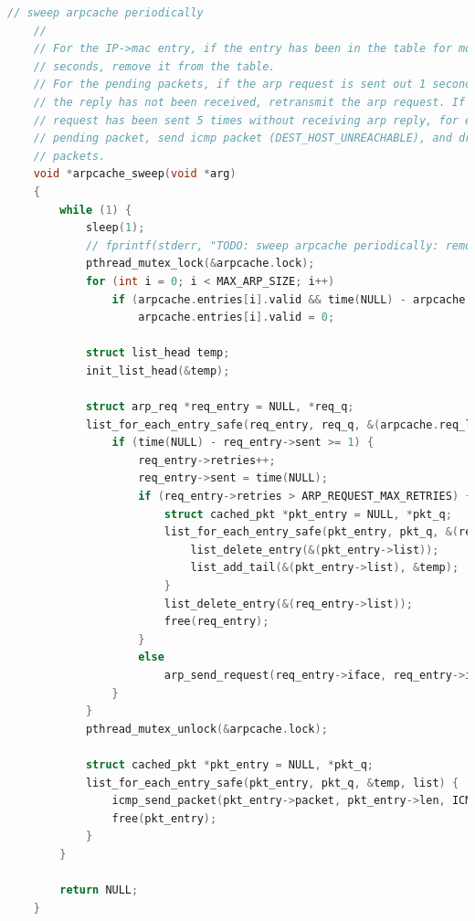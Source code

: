 \documentclass[UTF8]{report}
\begin{document}
\begin{lstlisting}[language=C]
    // sweep arpcache periodically
    //
    // For the IP->mac entry, if the entry has been in the table for more than 15
    // seconds, remove it from the table.
    // For the pending packets, if the arp request is sent out 1 second ago, while 
    // the reply has not been received, retransmit the arp request. If the arp
    // request has been sent 5 times without receiving arp reply, for each
    // pending packet, send icmp packet (DEST_HOST_UNREACHABLE), and drop these
    // packets.
    void *arpcache_sweep(void *arg) 
    {
        while (1) {
            sleep(1);
            // fprintf(stderr, "TODO: sweep arpcache periodically: remove old entries, resend arp requests .\n");
            pthread_mutex_lock(&arpcache.lock);
            for (int i = 0; i < MAX_ARP_SIZE; i++) 
                if (arpcache.entries[i].valid && time(NULL) - arpcache.entries[i].added > ARP_ENTRY_TIMEOUT) 
                    arpcache.entries[i].valid = 0;
    
            struct list_head temp;
            init_list_head(&temp);
    
            struct arp_req *req_entry = NULL, *req_q;
            list_for_each_entry_safe(req_entry, req_q, &(arpcache.req_list), list) {
                if (time(NULL) - req_entry->sent >= 1) {
                    req_entry->retries++;
                    req_entry->sent = time(NULL);
                    if (req_entry->retries > ARP_REQUEST_MAX_RETRIES) {
                        struct cached_pkt *pkt_entry = NULL, *pkt_q;
                        list_for_each_entry_safe(pkt_entry, pkt_q, &(req_entry->cached_packets), list) {
                            list_delete_entry(&(pkt_entry->list));
                            list_add_tail(&(pkt_entry->list), &temp);
                        }
                        list_delete_entry(&(req_entry->list));
                        free(req_entry);
                    }
                    else
                        arp_send_request(req_entry->iface, req_entry->ip4);
                }
            }
            pthread_mutex_unlock(&arpcache.lock);
    
            struct cached_pkt *pkt_entry = NULL, *pkt_q;
            list_for_each_entry_safe(pkt_entry, pkt_q, &temp, list) {
                icmp_send_packet(pkt_entry->packet, pkt_entry->len, ICMP_DEST_UNREACH, ICMP_HOST_UNREACH);
                free(pkt_entry);
            }
        }
    
        return NULL;
    }    
\end{lstlisting}
\end{document}
